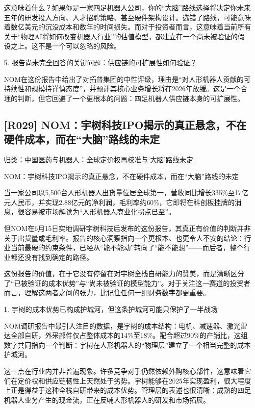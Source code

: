 \documentclass[11pt]{ctexart}
\begin{document}
这意味着什么？如果你是一家四足机器人公司，你的“大脑”路线选择将决定你未来五年的研发投入方向、人才招聘策略、甚至硬件架构设计。选错了路线，可能意味着数亿美元的沉没成本和数年的时间损失。而对于投资者而言，这意味着当前所有关于“物理AI将如何改变机器人行业”的估值模型，都建立在一个尚未被验证的假设之上。这不是一个可以忽略的风险。

5. 报告尚未完全回答的关键问题：供应链的可扩展性如何验证？

NOM在这份报告中给出了对拓普集团的中性评级，理由是“对人形机器人贡献的可持续性和规模持谨慎态度”，并预计其核心业务增长将在2026年放缓。这是一个合理的判断，但它回避了一个更根本的问题：四足机器人供应链本身的可扩展性。

\subsection{[R029] NOM：宇树科技IPO揭示的真正悬念，不在硬件成本，而在“大脑”路线的未定}
{\small\color{refgray}归类：中国医药与机器人：全球定价权再校准与‘大脑’路线未定}

NOM：宇树科技IPO揭示的真正悬念，不在硬件成本，而在“大脑”路线的未定

当一家公司以5,500台人形机器人出货量位居全球第一，营收同比增长335\%至17亿元人民币，并实现2.88亿元的净利润，毛利率约60\%，它即将在科创板挂牌的消息，很容易被市场解读为“人形机器人商业化拐点已至”。

但NOM在6月15日实地调研宇树科技后发布的这份报告，其真正有价值的判断并非关于出货量或毛利率。报告的核心洞察指向一个更根本、也更令人不安的结论：行业当前最硬的约束条件，已经从“能不能动”转向了“能不能想”——而后者，整个行业都还没有找到确定的路径。

这份报告的价值，在于它没有停留在对宇树全栈自研能力的赞美，而是清晰区分了“已被验证的成本优势”与“尚未被验证的模型能力”。对于关注这一赛道的投资者而言，理解这两者之间的张力，比记住任何一组财务数字都更重要。

1. 宇树的成本优势已构成护城河，但这条护城河可能只保护了一半战场

NOM调研报告中最引人注目的数据，是宇树的成本结构：电机、减速器、激光雷达全部自研，外采部件仅占整体成本的14\%至18\%。配合超过90\%的产销比，这组数字共同指向一个判断：宇树在人形机器人的“物理层”建立了一个相当完整的成本护城河。

这一点在行业内并非普遍现象。许多竞争对手仍然依赖外购核心部件，这意味着它们在定价权和供应链韧性上天然处于劣势。宇树能够在2025年实现盈利，很大程度上正是得益于这种全栈自研带来的成本优势。管理层的表述也很清晰：成熟的四足机器人业务产生的现金流，正在反哺人形机器人的研发和市场拓展。
\end{document}
